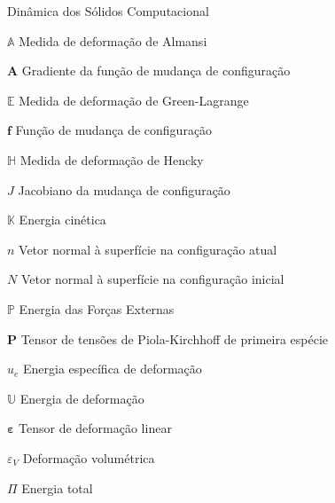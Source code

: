 \documentclass[12pt,
	openright,	%
	twoside,    %
	a4paper,			%
	sumario=tradicional,
	english,			%
	french, 			%
	brazil				%
]{USPSC}
\begin{document}
\begin{simbolos}
    \item[Dinâmica dos Sólidos Computacional]
    \item[$\mathbb{A}$] Medida de deformação de Almansi
    \item[$\mathbf{A}$] Gradiente da função de mudança de configuração
    \item[$\mathbb{E}$] Medida de deformação de Green-Lagrange
    \item[$\mathbf{f}$] Função de mudança de configuração
    \item[$\mathbb{H}$] Medida de deformação de Hencky
    \item[$J$] Jacobiano da mudança de configuração
    \item[$\mathbb{K}$] Energia cinética
    \item[$n$] Vetor normal à superfície na configuração atual
    \item[$N$] Vetor normal à superfície na configuração inicial
    \item[$\mathbb{P}$] Energia das Forças Externas
    \item[$\mathbf{P}$] Tensor de tensões de Piola-Kirchhoff de primeira espécie
    \item[$u_e$] Energia específica de deformação
    \item[$\mathbb{U}$] Energia de deformação
    \item[$\mathbf{\varepsilon}$] Tensor de deformação linear
    \item[$\varepsilon_V$] Deformação volumétrica
    \item[$\Pi$] Energia total


\end{simbolos}
\end{document}
